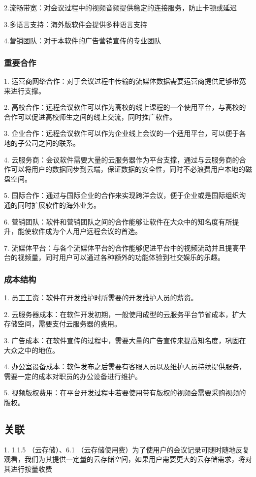 \documentclass[a4paper,12pt]{article}
\begin{document}
2.流畅带宽：对会议过程中的视频音频提供稳定的连接服务，防止卡顿或延迟

3.多语言支持：海外版软件会提供多种语言支持

4.营销团队：对于本软件的广告营销宣传的专业团队

\subsubsection{重要合作}
1. 运营商网络合作：对于会议过程中传输的流媒体数据需要运营商提供足够带宽来进行支撑。

2. 高校合作：远程会议软件可以作为高校的线上课程的一个使用平台，与高校的合作可以促进高校师生之间的线上交流，同时推广软件。

3. 企业合作：远程会议软件可以作为企业线上会议的一个适用平台，可以便于各地的子公司之间的联系。

4. 云服务商：会议软件需要大量的云服务器作为平台支撑，通过与云服务商的合作可以将用户的数据同步到云端，保证数据的安全性，同时不必浪费用户本地的磁盘空间。

5. 国际合作：通过与国际企业的合作来实现跨洋会议，便于企业或是国际组织沟通的同时扩展软件的海外业务。

6. 营销团队：软件和营销团队之间的合作能够让软件在大众中的知名度有所提升，能使软件成为个人用户远程会议的首选。

7. 流媒体平台：与各个流媒体平台的合作能够促进平台中的视频流动并且提高平台的视频量，同时用户可以通过各种额外的功能体验到社交娱乐的乐趣。
\subsubsection{成本结构}
1. 员工工资：软件在开发维护时所需要的开发维护人员的薪资。

2. 云服务器成本：在软件开发初期，一般使用成型的云服务平台节省成本，扩大存储空间，需要支付云服务器的费用。

3. 广告成本：在软件宣传的过程中，需要大量的广告宣传来提高知名度，巩固在大众之中的地位。

4. 办公室设备成本：软件发布之后需要有客服人员以及维护人员持续提供服务，需要一定的成本对职员的办公设备进行维护。

5. 视频版权费用：在平台开发过程中若要使用带有版权的视频会需要采购视频的版权。
\subsection{关联}
1. 1.1.5 （云存储）、6.1 （云存储使用费）为了使用户的会议记录可随时随地反复观看，我们为其提供一定量的云存储空间，如果用户需要更大的云存储需求，将对其进行按量收费
\end{document}
